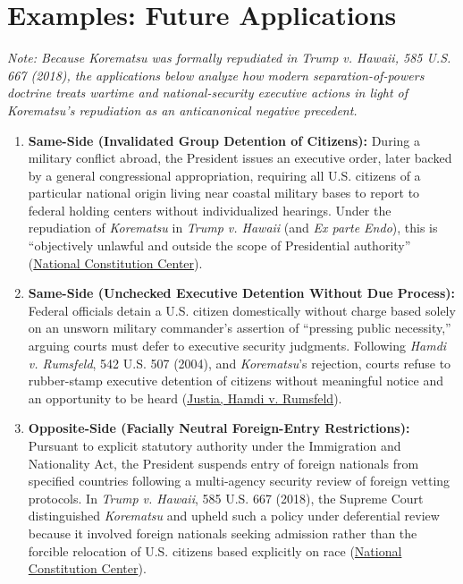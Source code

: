 \documentclass[12pt]{article}
\begin{document}
\section{Examples: Future Applications}
\textit{Note: Because \textit{Korematsu} was formally repudiated in \textit{Trump v. Hawaii}, 585 U.S. 667 (2018), the applications below analyze how modern separation-of-powers doctrine treats wartime and national-security executive actions in light of \textit{Korematsu}'s repudiation as an anticanonical negative precedent.}
\begin{enumerate}
    \item \textbf{Same-Side (Invalidated Group Detention of Citizens):} During a military conflict abroad, the President issues an executive order, later backed by a general congressional appropriation, requiring all U.S. citizens of a particular national origin living near coastal military bases to report to federal holding centers without individualized hearings. Under the repudiation of \textit{Korematsu} in \textit{Trump v. Hawaii} (and \textit{Ex parte Endo}), this is ``objectively unlawful and outside the scope of Presidential authority'' (\href{https://constitutioncenter.org/blog/on-this-day-the-supreme-court-issues-the-korematsu-decision}{National Constitution Center}).
    \item \textbf{Same-Side (Unchecked Executive Detention Without Due Process):} Federal officials detain a U.S. citizen domestically without charge based solely on an unsworn military commander's assertion of ``pressing public necessity,'' arguing courts must defer to executive security judgments. Following \textit{Hamdi v. Rumsfeld}, 542 U.S. 507 (2004), and \textit{Korematsu}'s rejection, courts refuse to rubber-stamp executive detention of citizens without meaningful notice and an opportunity to be heard (\href{https://supreme.justia.com/cases/federal/us/542/507/}{Justia, Hamdi v. Rumsfeld}).
    \item \textbf{Opposite-Side (Facially Neutral Foreign-Entry Restrictions):} Pursuant to explicit statutory authority under the Immigration and Nationality Act, the President suspends entry of foreign nationals from specified countries following a multi-agency security review of foreign vetting protocols. In \textit{Trump v. Hawaii}, 585 U.S. 667 (2018), the Supreme Court distinguished \textit{Korematsu} and upheld such a policy under deferential review because it involved foreign nationals seeking admission rather than the forcible relocation of U.S. citizens based explicitly on race (\href{https://constitutioncenter.org/blog/on-this-day-the-supreme-court-issues-the-korematsu-decision}{National Constitution Center}).

\end{enumerate}
\end{document}
